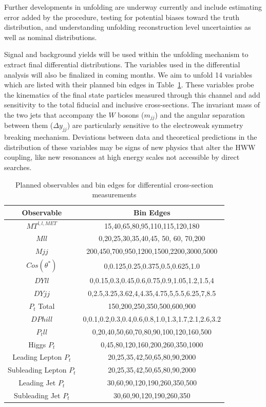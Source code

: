 Further developments in unfolding are underway currently and include estimating error added by the procedure, testing for potential biases toward the truth distribution, and understanding unfolding reconstruction level uncertainties as well as nominal distributions. 

Signal and background yields will be used within the unfolding mechanism to extract final differential distributions. The variables used in the differential analysis will also be finalized in coming months. We aim to unfold 14 variables which are listed with their planned bin edges in Table~\ref{tab:observablebins}. These variables probe the kinematics of the final state particles measured through this channel and add sensitivity to the total fiducial and inclusive cross-sections. The invariant mass of the two jets that accompany the $W$ bosons ($m_{jj}$) and the angular separation between them ($\Delta y_{jj}$) are particularly sensitive to the electroweak symmetry breaking mechanism. Deviations between data and theoretical predictions in the distribution of these variables may be signs of new physics that alter the HWW coupling, like new resonances at high energy scales not accessible by direct searches.                

\begin{table}[h!]
\begin{center}
\begin{tabular}{ |c||c|  }
 \hline
 Observable & Bin Edges\\
 \hline
 $MT^{l,l,MET}$ &15,40,65,80,95,110,115,120,180\\
 $Mll$&  0,20,25,30,35,40,45, 50, 60, 70,200\\
 $Mjj$ &200,450,700,950,1200,1500,2200,3000,5000\\
 $Cos(\theta^{*})$ &0,0.125,0.25,0.375,0.5,0.625,1.0\\
 $DYll$&   0,0.15,0.3,0.45,0.6,0.75,0.9,1.05,1.2,1.5,4\\
 $DYjj$& 0,2.5,3.25,3.62,4,4.35,4.75,5,5.5,6.25,7,8.5\\
 $P_{t}$ Total& 150,200,250,350,500,600,900\\
 $DPhill$& 0,0.1,0.2,0.3,0.4,0.6,0.8,1.0,1.3,1.7,2.1,2.6,3.2\\
 $P_{t} ll$&0,20,40,50,60,70,80,90,100,120,160,500\\
 Higgs $P_{t}$&0,45,80,120,160,200,260,350,1000\\
 Leading Lepton $P_{t}$&20,25,35,42,50,65,80,90,2000\\
 Subleading Lepton $P_{t}$&20,25,35,42,50,65,80,90,2000\\
 Leading Jet $P_{t}$&30,60,90,120,190,260,350,500\\
 Subleading Jet $P_{t}$& 30,60,90,120,190,260,350\\
 \hline
\end{tabular}
\end{center}
\caption{Planned observables and bin edges for differential cross-section measurements}
\label{tab:observablebins}
\end{table}

